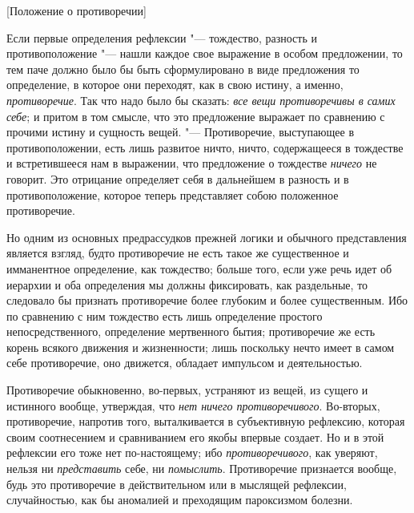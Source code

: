 %
  {[Положение о противоречии]}

Если первые определения рефлексии "--- тождество, разность и противоположение
"--- нашли каждое свое выражение в особом предложении, то тем паче должно было
бы быть сформулировано в виде предложения то определение, в которое они
переходят, как в свою истину, а именно,
{\em противоречие}. Так что надо было бы сказать:
{\em все вещи противоречивы в самих себе}; и притом в
том смысле, что это предложение выражает по сравнению с прочими истину и
сущность вещей. "--- Противоречие, выступающее в противоположении, есть лишь
развитое ничто, ничто, содержащееся в тождестве и встретившееся нам в
выражении, что предложение о тождестве {\em ничего} не
говорит. Это отрицание определяет себя в дальнейшем в разность и в
противоположение, которое теперь представляет собою положенное противоречие.

Но одним из основных предрассудков прежней логики и обычного представления
является взгляд, будто противоречие не есть такое же существенное и
имманентное определение, как тождество; больше того, если уже речь идет об
иерархии и оба определения мы должны фиксировать, как раздельные, то
следовало бы признать противоречие более глубоким и более существенным. Ибо
по сравнению с ним тождество есть лишь определение простого
непосредственного, определение мертвенного бытия; противоречие же есть
корень всякого движения и жизненности; лишь поскольку нечто имеет в самом
себе противоречие, оно движется, обладает импульсом и деятельностью.

Противоречие обыкновенно, во-первых, устраняют из вещей, из сущего и
истинного вообще, утверждая, что {\em нет ничего
противоречивого}. Во-вторых, противоречие, напротив того, выталкивается в
субъективную рефлексию, которая своим соотнесением и сравниванием его якобы
впервые создает. Но и в этой рефлексии его тоже нет по-настоящему; ибо
{\em противоречивого}, как уверяют, нельзя ни {\em представить} себе, ни
{\em помыслить}. Противоречие признается вообще, будь
это противоречие в действительном или в мыслящей рефлексии, случайностью,
как бы аномалией и преходящим пароксизмом болезни.

